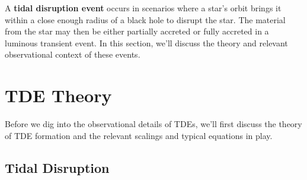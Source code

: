 A \textbf{tidal disruption event} occurs in scenarios where a star's orbit brings it within a close enough radius of a black hole to disrupt the star. The material from the star may then be either partially accreted or fully accreted in a luminous transient event. In this section, we'll discuss the theory and relevant observational context of these events.

\section{TDE Theory}
Before we dig into the observational details of TDEs, we'll first discuss the theory of TDE formation and the relevant scalings and typical equations in play. 

\subsection{Tidal Disruption}

